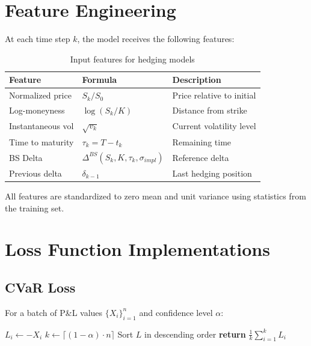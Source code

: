\section{Feature Engineering}
\label{app:features}

At each time step $k$, the model receives the following features:

\begin{table}[h]
\centering
\caption{Input features for hedging models}
\begin{tabular}{lll}
\toprule
\textbf{Feature} & \textbf{Formula} & \textbf{Description} \\
\midrule
Normalized price & $S_k / S_0$ & Price relative to initial \\
Log-moneyness & $\log(S_k / K)$ & Distance from strike \\
Instantaneous vol & $\sqrt{v_k}$ & Current volatility level \\
Time to maturity & $\tau_k = T - t_k$ & Remaining time \\
BS Delta & $\Delta^{BS}(S_k, K, \tau_k, \sigma_{impl})$ & Reference delta \\
Previous delta & $\delta_{k-1}$ & Last hedging position \\
\bottomrule
\end{tabular}
\end{table}

All features are standardized to zero mean and unit variance using statistics from the training set.

\section{Loss Function Implementations}
\label{app:losses}

\subsection{CVaR Loss}

For a batch of P\&L values $\{X_i\}_{i=1}^n$ and confidence level $\alpha$:

\begin{algorithmic}
\STATE $L_i \gets -X_i$ 
\STATE $k \gets \lceil (1-\alpha) \cdot n \rceil$
\STATE Sort $L$ in descending order
\STATE \textbf{return} $\frac{1}{k}\sum_{i=1}^k L_i$ 
\end{algorithmic}

